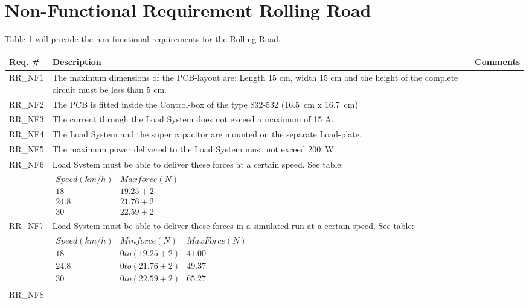 \section{Non-Functional Requirement Rolling Road}
Table \ref{NFREQ_RR} will provide the non-functional requirements for the Rolling Road.

\begin{table}[h!]
	\label{NFREQ_RR}
	\centering
	\begin{tabular}{|p{2 cm}|p{10 cm}|p{2 cm}|}
		\hline
		\textbf{Req. \#} & \textbf{Description} & \textbf{Comments} \\\hline
		RR\_NF1
		& The maximum dimensions of the PCB-layout are: Length 15 cm, width 15 cm and the height of the complete circuit must be less than 5 cm. 
		&  \\ \hline
		RR\_NF2
		& The PCB is fitted inside the Control-box of the type 832-532 (\SI{16.5}{\centi \meter} x \SI{16.7}{\centi \meter})
		& \\ \hline
		RR\_NF3
		& The current through the Load System does not exceed a maximum of 15 A.
		& \\ \hline
		RR\_NF4
		& The Load System and the super capacitor are mounted on the separate Load-plate.
		& \\ \hline
		RR\_NF5
		& The maximum power delivered to the Load System must not exceed \SI{200}{\watt}.
		& \\ \hline
		RR\_NF6 
		& Load System must be able to deliver these forces at a certain speed. See table: 
		& \\ &
		$\begin{array}{c|c}
			Speed (km/h) & Max force (N) \\ 
			18 & 19.25+2 \\ 
			24.8 & 21.76+2 \\ 
			30 & 22.59+2
		\end{array} $
		& \\ \hline
		RR\_NF7
		& Load System must be able to deliver these forces in a simulated run at a certain speed. See table:
		& \\ &
		$\begin{array}{c|c|c}
			Speed (km/h) & Min force (N) & Max Force (N) \\ 
			18 & 0 to (19.25+2) & 41.00 \\ 
			24.8 & 0 to (21.76+2) & 49.37 \\ 
			30 & 0 to (22.59+2) & 65.27
		\end{array}$
		& \\ \hline
		RR\_NF8

\end{tabular}
\end{table}
